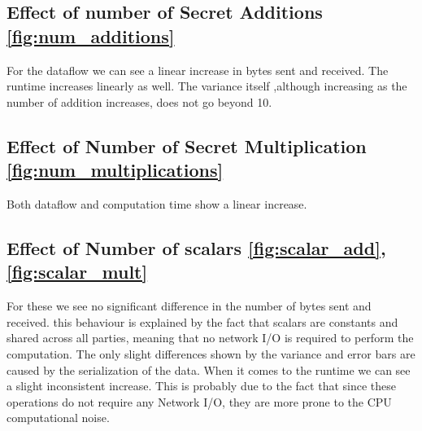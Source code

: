 \documentclass[10pt,conference,compsocconf]{IEEEtran}
\begin{document}
\subsection{Effect of number of Secret Additions \ref{fig:num_additions}}

For the dataflow we can see a linear increase in bytes sent and received.
The runtime increases linearly as well.
The variance itself ,although increasing as the number of addition increases, does not go beyond 10.

\subsection{Effect of Number of Secret Multiplication \ref{fig:num_multiplications}}
Both dataflow and computation time show a linear increase.

\subsection{Effect of Number of scalars \ref{fig:scalar_add},\ref{fig:scalar_mult}}
For these we see no significant difference in the number of bytes sent and received.
this behaviour is explained by the fact that scalars are constants and shared across all parties, meaning that no network
I/O is required to perform the computation.
The only slight differences shown by the variance and error bars are caused by the serialization of the data.
When it comes to the runtime we can see a slight inconsistent increase.
This is probably due to the fact that since these operations do not require any Network I/O, they are more
prone to the CPU computational noise.
\end{document}
